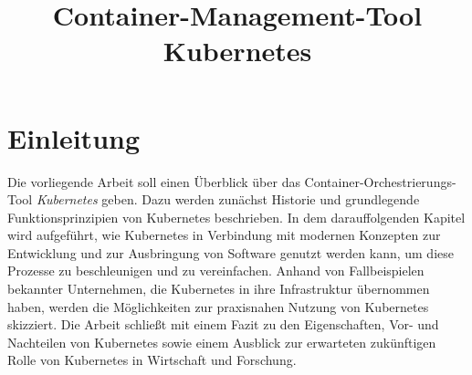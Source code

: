 \documentclass[11pt,a4paper]{article}
\title{Container-Management-Tool Kubernetes}
\begin{document}

\tableofcontents
\thispagestyle{empty}
\newpage



\clearpage
{}
\section{Einleitung}
\label{sec:einleitung}
Die vorliegende Arbeit soll einen Überblick über das Container-Orchestrierungs-Tool \emph{Kubernetes} geben.
Dazu werden zunächst Historie und grundlegende Funktionsprinzipien von Kubernetes beschrieben.
In dem darauffolgenden Kapitel wird aufgeführt, wie Kubernetes in Verbindung mit modernen
Konzepten zur Entwicklung und zur Ausbringung von Software genutzt werden kann,
um diese Prozesse zu beschleunigen und zu vereinfachen.
Anhand von Fallbeispielen bekannter Unternehmen, die Kubernetes in ihre Infrastruktur übernommen haben,
werden die Möglichkeiten zur praxisnahen Nutzung von Kubernetes skizziert.
Die Arbeit schließt mit einem Fazit zu den Eigenschaften, Vor- und Nachteilen
von Kubernetes sowie einem Ausblick zur erwarteten zukünftigen Rolle von Kubernetes
in Wirtschaft und Forschung.
\end{document}
